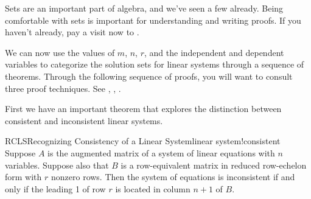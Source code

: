 %
%
Sets are an important part of algebra, and we've seen a few already.  Being comfortable with sets is important for understanding and writing proofs.  If you haven't already, pay a visit now to .\par
%
We can now use the values of $m$, $n$, $r$, and the independent and dependent variables to categorize the solution sets for linear systems through a sequence of theorems.
%
Through the following sequence of proofs, you will want to consult three proof techniques. See , , .\par
%
First we have an important theorem that explores the distinction between consistent and inconsistent linear systems.
%
\begin{theorem}{RCLS}{Recognizing Consistency of a Linear System}{linear system!consistent}
Suppose $A$ is the augmented matrix of a system of linear equations with $n$ variables.  Suppose also that $B$ is a row-equivalent matrix in reduced row-echelon form with $r$ nonzero rows.  Then the system of equations is inconsistent if and only if the leading 1 of row $r$ is located in column $n+1$ of $B$.
\end{theorem}
%
